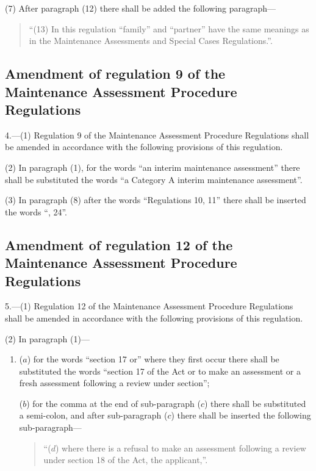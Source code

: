 \documentclass[a4paper]{article}
\begin{document}
(7) After paragraph (12) there shall be added the following paragraph---
\begin{quotation}
“(13) In this regulation “family” and “partner” have the same meanings as in the Maintenance Assessments and Special Cases Regulations.”.
\end{quotation}

\subsection[4. Amendment of regulation 9 of the Maintenance Assessment Procedure Regulations]{Amendment of regulation 9 of the Maintenance Assessment Procedure Regulations}

4.—(1) Regulation 9 of the Maintenance Assessment Procedure Regulations shall be amended in accordance with the following provisions of this regulation.

(2) In paragraph (1), for the words “an interim maintenance assessment” there shall be substituted the words “a Category A interim maintenance assessment”.

(3) In paragraph (8) after the words “Regulations 10, 11” there shall be inserted the words “, 24”.

\subsection[5. Amendment of regulation 12 of the Maintenance Assessment Procedure Regulations]{Amendment of regulation 12 of the Maintenance Assessment Procedure Regulations}

5.—(1) Regulation 12 of the Maintenance Assessment Procedure Regulations shall be amended in accordance with the following provisions of this regulation.

(2) In paragraph (1)---
\begin{enumerate}\item[]
($a$) for the words “section 17 or” where they first occur there shall be substituted the words “section 17 of the Act or to make an assessment or a fresh assessment following a review under section”;

($b$) for the comma at the end of sub-paragraph ($c$) there shall be substituted a semi-colon, and after sub-paragraph ($c$) there shall be inserted the following sub-paragraph---
\begin{quotation}
“($d$) where there is a refusal to make an assessment following a review under section 18 of the Act, the applicant,”.
\end{quotation}
\end{enumerate}
\end{document}
